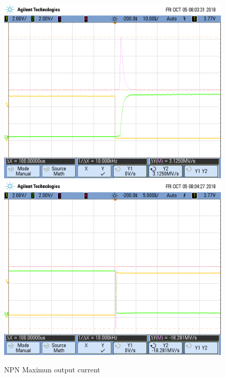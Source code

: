 \begin{figure}[h!]
\centering
\includegraphics[scale=0.2]{../Exercise1/i_npn2.png}\hspace{1cm}
\includegraphics[scale=0.2]{../Exercise1/i_npn3.png}
\caption{\color{cyan}NPN Maximun output current}
\label{circnpnmaxout}
\end{figure}


